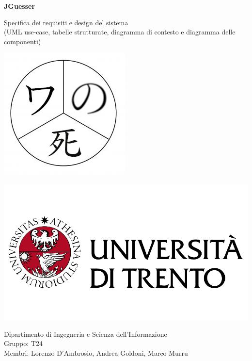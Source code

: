 \documentclass[11pt]{article}
\begin{document}
\begin{titlepage}
		\begin{center}
		    \Huge
			\textbf{JGuesser}
			
			\LARGE
			\vspace{0.85cm}
			Specifica dei requisiti e design del sistema\\
			(UML use-case, tabelle strutturate, diagramma di contesto e diagramma delle componenti)
			\vspace{0.5cm}
			
			\includegraphics[scale=2.5]{images/logo_progetto_se-t24.png}
			
			\vfill
			
		    \includegraphics[scale=0.200]{images/logo_unitn.png}
			
			\Large
			Dipartimento di Ingegneria e Scienza dell’Informazione \\
			Gruppo: T24 \\
			Membri: Lorenzo D'Ambrosio, Andrea Goldoni, Marco Murru
				
			\vspace{1.5cm}
    		
		\end{center}
	\end{titlepage}

\tableofcontents





\end{document}
